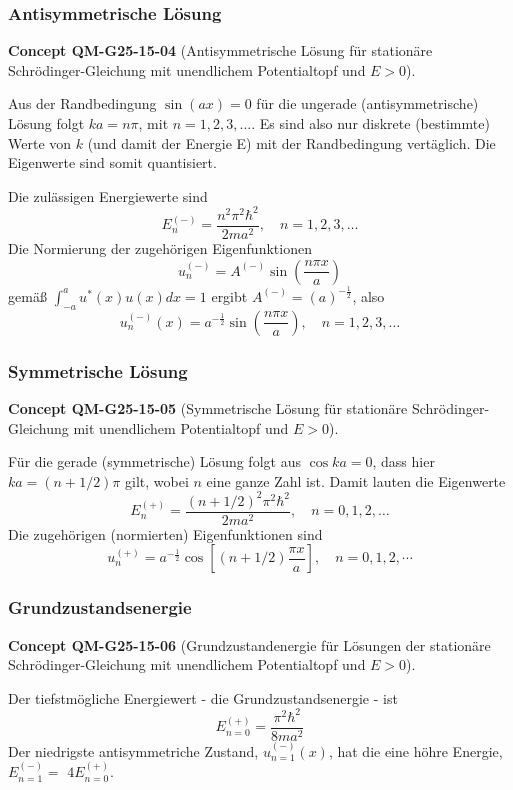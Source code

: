 \documentclass[10pt, letterpaper]{article}
\newcommand{\CustomHeading}[3]{%
  \par\medskip\noindent%
  \textbf{#1 #2} \textnormal{(#3)}.\enskip%
}
\newenvironment{CONC}[2]{\begin{unitbox}\CustomHeading{Concept}{#1}{#2}}{\end{unitbox}}
\begin{document}
\subsubsection*{Antisymmetrische Lösung}


\begin{CONC}{QM-G25-15-04}{Antisymmetrische Lösung für stationäre Schrödinger-Gleichung mit unendlichem Potentialtopf und $E>0$}
Aus der Randbedingung $\sin (a x)=0$ für die ungerade (antisymmetrische) Lösung folgt $k a=n \pi$, mit $n=1,2,3, \ldots$. Es sind also nur diskrete (bestimmte) Werte von $k$ (und damit der Energie E) mit der Randbedingung vertäglich. Die Eigenwerte sind somit quantisiert.

Die zulässigen Energiewerte sind
$$
E_{n}^{(-)}=\frac{n^{2} \pi^{2} \hbar^{2}}{2 m a^{2}}, \quad n=1,2,3, \ldots
$$
Die Normierung der zugehörigen Eigenfunktionen
$$
u_{n}^{(-)}=A^{(-)} \sin \left(\frac{n \pi x}{a}\right)
$$
gemäß $\int_{-a}^{a} u^{*}(x) u(x) d x=1$ ergibt $A^{(-)}=(a)^{-\frac{1}{2}}$, also
$$
u_{n}^{(-)}(x)=a^{-\frac{1}{2}} \sin \left(\frac{n \pi x}{a}\right), \quad n=1,2,3, \ldots
$$
\end{CONC}

\subsubsection*{Symmetrische Lösung}

\begin{CONC}{QM-G25-15-05}{Symmetrische Lösung für stationäre Schrödinger-Gleichung mit unendlichem Potentialtopf und $E>0$}
Für die gerade (symmetrische) Lösung folgt aus $\cos k a=0$, dass hier $k a=(n+1 / 2) \pi$ gilt, wobei $n$ eine ganze Zahl ist. Damit lauten die Eigenwerte
$$
E_{n}^{(+)}=\frac{(n+1 / 2)^{2} \pi^{2} \hbar^{2}}{2 m a^{2}}, \quad n=0,1,2, \ldots
$$
Die zugehörigen (normierten) Eigenfunktionen sind
$$
u_{n}^{(+)}=a^{-\frac{1}{2}} \cos \left[(n+1 / 2) \frac{\pi x}{a}\right], \quad n=0,1,2, \cdots
$$
\end{CONC}


\subsubsection*{Grundzustandsenergie}


\begin{CONC}{QM-G25-15-06}{Grundzustandenergie für Lösungen der stationäre Schrödinger-Gleichung mit unendlichem Potentialtopf und $E>0$}
Der tiefstmögliche Energiewert - die Grundzustandsenergie - ist
$$
E_{n=0}^{(+)}=\frac{\pi^{2} \hbar^{2}}{8 m a^{2}}
$$
Der niedrigste antisymmetriche Zustand, $u_{n=1}^{(-)}(x)$, hat die eine höhre Energie, $E_{n=1}^{(-)}=$ $4 E_{n=0}^{(+)}$.
\end{CONC}
\end{document}
